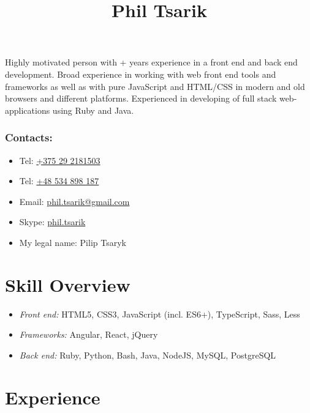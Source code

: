 \documentclass[a4paper, 12pt]{article}
\title{Phil Tsarik}
\author{}
\date{}
\newcommand{\itemlabel}[1]{
    \textit{#1:}}
\newcommand{\defvalue}[2]{\ifx#1\empty#2\else#1\fi}
\newcommand{\yearsexp}{%
    \FPeval{\result}{clip(\the\year - 2011)}%
    \defvalue{\result}{4+}}
\begin{document}
\maketitle

Highly motivated person with \yearsexp{} years experience in a front end and back end development.
Broad experience in working with web front end tools and frameworks as well as with pure JavaScript and HTML/CSS in modern and old browsers and different platforms.
Experienced in developing of full stack web-applications using Ruby and Java.

\subsubsection*{Contacts:}
\begin{itemize}
    \item Tel: \href{tel:+375292181503}{+375 29 2181503}
    \item Tel: \href{tel:+48534898187}{+48 534 898 187}
    \item Email: \href{mailto:phil.tsarik@gmail.com}{phil.tsarik@gmail.com}
    \item Skype: \href{callto:phil.tsarik}{phil.tsarik}
    \item My legal name: Pilip Tsaryk
\end{itemize}


\section*{Skill Overview}

    \begin{itemize}
        \item \itemlabel{Front end} HTML5, CSS3, JavaScript (incl. ES6+), TypeScript, Sass, Less
        \item \itemlabel{Frameworks} Angular, React, jQuery
        \item \itemlabel{Back end} Ruby, Python, Bash, Java, NodeJS, MySQL, PostgreSQL
    \end{itemize}


\section*{Experience}
\end{document}
